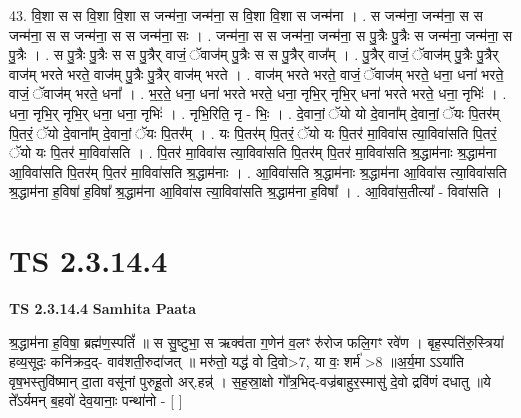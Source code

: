 \documentclass[17pt]{extarticle}
\begin{document}
43. वि॒शा स स वि॒शा वि॒शा स जन्म॑ना॒ जन्म॑ना॒ स वि॒शा वि॒शा स जन्म॑ना । . स जन्म॑ना॒ जन्म॑ना॒ स स जन्म॑ना॒ स स जन्म॑ना॒ स स जन्म॑ना॒ सः । . जन्म॑ना॒ स स जन्म॑ना॒ जन्म॑ना॒ स पु॒त्रैः पु॒त्रैः स जन्म॑ना॒ जन्म॑ना॒ स पु॒त्रैः । . स पु॒त्रैः पु॒त्रैः स स पु॒त्रैर् वाजं॒ ॅवाज॑म् पु॒त्रैः स स पु॒त्रैर् वाज᳚म् । . पु॒त्रैर् वाजं॒ ॅवाज॑म् पु॒त्रैः पु॒त्रैर् वाज॑म् भरते भरते॒ वाज॑म् पु॒त्रैः पु॒त्रैर् वाज॑म् भरते । . वाज॑म् भरते भरते॒ वाजं॒ ॅवाज॑म् भरते॒ धना॒ धना॑ भरते॒ वाजं॒ ॅवाज॑म् भरते॒ धना᳚ । . भ॒र॒ते॒ धना॒ धना॑ भरते भरते॒ धना॒ नृभि॒र् नृभि॒र् धना॑ भरते भरते॒ धना॒ नृभिः॑ । . धना॒ नृभि॒र् नृभि॒र् धना॒ धना॒ नृभिः॑ । . नृभि॒रिति॒ नृ - भिः॒ । . दे॒वानां॒ ॅयो यो दे॒वाना᳚म् दे॒वानां॒ ॅयः पि॒तर॑म् पि॒तरं॒ ॅयो दे॒वाना᳚म् दे॒वानां॒ ॅयः पि॒तर᳚म् । . यः पि॒तर॑म् पि॒तरं॒ ॅयो यः पि॒तर॑ मा॒विवा॑स त्या॒विवा॑सति पि॒तरं॒ ॅयो यः पि॒तर॑ मा॒विवा॑सति । . पि॒तर॑ मा॒विवा॑स त्या॒विवा॑सति पि॒तर॑म् पि॒तर॑ मा॒विवा॑सति श्र॒द्धाम॑नाः श्र॒द्धाम॑ना आ॒विवा॑सति पि॒तर॑म् पि॒तर॑ मा॒विवा॑सति श्र॒द्धाम॑नाः । . आ॒विवा॑सति श्र॒द्धाम॑नाः श्र॒द्धाम॑ना आ॒विवा॑स त्या॒विवा॑सति श्र॒द्धाम॑ना ह॒विषा॑ ह॒विषा᳚ श्र॒द्धाम॑ना आ॒विवा॑स त्या॒विवा॑सति श्र॒द्धाम॑ना ह॒विषा᳚ । . आ॒विवा॑स॒तीत्या᳚ - विवा॑सति । \newline
\pagebreak
{}

\section{ TS 2.3.14.4 }

\textbf{TS 2.3.14.4 } \newline
\textbf{Samhita Paata} \newline

श्र॒द्धाम॑ना ह॒विषा॒ ब्रह्म॑ण॒स्पतिं᳚ ॥ स सु॒ष्टुभा॒ स ऋक्व॑ता ग॒णेन॑ व॒लꣳ रु॑रोज फलि॒गꣳ रवे॑ण । बृह॒स्पति॑रु॒स्त्रिया॑ हव्य॒सूदः॒ कनि॑क्रद॒द्- वाव॑शती॒रुदा॑जत् ॥ मरु॑तो॒ यद्ध॑ वो दि॒वो>7, या वः॒ शर्म॑ >8 ॥अ॒र्य॒मा ऽऽया॑ति वृष॒भस्तुवि॑ष्मान् दा॒ता वसू॑नां पुरुहू॒तो अर्.हन्न्॑ । स॒ह॒स्रा॒क्षो गो᳚त्र॒भिद्-वज्र॑बाहुर॒स्मासु॑ दे॒वो द्रवि॑णं दधातु ॥ये ते᳚ऽर्यमन् ब॒हवो॑ देव॒यानाः॒ पन्था॑नो - [  ] \newline
\end{document}
